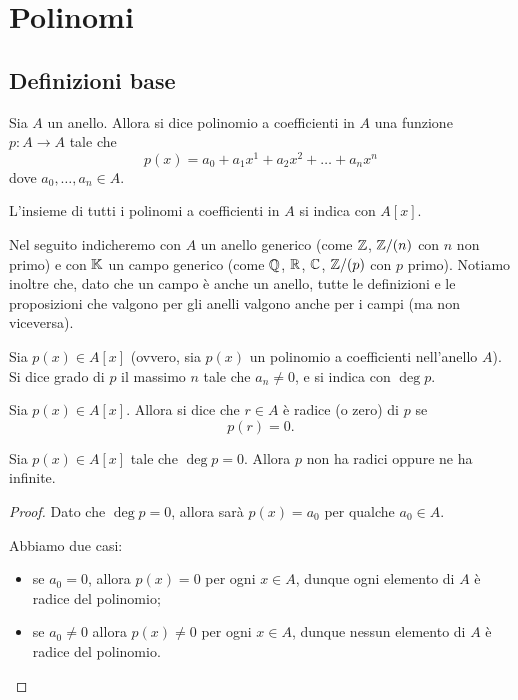 \chapter{Polinomi}

\section{Definizioni base}

\begin{definition}[Polinomio]
    Sia $A$ un anello. Allora si dice polinomio a coefficienti in $A$ una funzione $p : A \to A$ tale che \begin{equation}
        p(x) = a_0 + a_1x^1 + a_2x^2+ \dots + a_nx^n
    \end{equation}
    dove $a_0, \dots, a_n \in A$.

    L'insieme di tutti i polinomi a coefficienti in $A$ si indica con $A[x]$.
\end{definition}

Nel seguito indicheremo con $A$ un anello generico (come $\mathbb{Z}$, $\mathbb{Z}/(n)$ con $n$ non primo) e con $\mathbb{K}$ un campo generico (come $\mathbb{Q}$, $\mathbb{R}$, $\mathbb{C}$, $\mathbb{Z}/(p)$ con $p$ primo). Notiamo inoltre che, dato che un campo è anche un anello, tutte le definizioni e le proposizioni che valgono per gli anelli valgono anche per i campi (ma non viceversa).

\begin{definition}
    Sia $p(x) \in A[x]$ (ovvero, sia $p(x)$ un polinomio a coefficienti nell'anello $A$). Si dice grado di $p$ il massimo $n$ tale che $a_n \neq 0$, e si indica con $\deg p$.
\end{definition}

\begin{definition}
    Sia $p(x) \in A[x]$. Allora si dice che $r \in A$ è radice (o zero) di $p$ se \begin{equation}
        p(r) = 0.
    \end{equation}
\end{definition}

\begin{proposition}
    Sia $p(x) \in A[x]$ tale che $\deg p = 0$. Allora $p$ non ha radici oppure ne ha infinite.
\end{proposition}
\begin{proof}
    Dato che $\deg p = 0$, allora sarà $p(x) = a_0$ per qualche $a_0 \in A$.

    Abbiamo due casi: \begin{itemize}
        \item se $a_0 = 0$, allora $p(x) = 0$ per ogni $x \in A$, dunque ogni elemento di $A$ è radice del polinomio;
        \item se $a_0 \neq 0$ allora $p(x) \neq 0$ per ogni $x \in A$, dunque nessun elemento di $A$ è radice del polinomio. \qedhere
    \end{itemize}
\end{proof}


